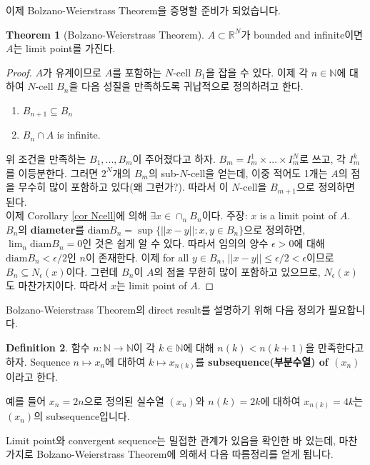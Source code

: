 \documentclass[12pt]{article}
\theoremstyle{definition}
\newtheorem{thm}{Theorem}[section]
\newtheorem{defn}[thm]{Definition}
\def\NN{\mathbb{N}}
\def\RR{\mathbb{R}}
\def\eps{\epsilon}
\newcommand{\norm}[1]{\left\vert\left\vert#1\right\vert\right\vert}
\begin{document}
이제 Bolzano-Weierstrass Theorem을 증명할 준비가 되었습니다.

	\begin{thm}[Bolzano-Weierstrass Theorem]
		\(A \subset \RR^N\)가 bounded and infinite이면 \(A\)는 limit point를 가진다.
	\end{thm}
	\begin{proof}
		\(A\)가 유계이므로 \(A\)를 포함하는 \(N\)-cell \(B_1\)을 잡을 수 있다. 이제 각 \(n \in \NN\)에 대하여 \(N\)-cell \(B_n\)을 다음 성질을 만족하도록 귀납적으로 정의하려고 한다.
		\begin{enumerate}[label=(\alph*), leftmargin=2\parindent]
			\item
			\(B_{n+1} \subseteq B_n\)
			\item
			\(B_n \cap A\) is infinite.
		\end{enumerate}
		위 조건을 만족하는 \(B_1, ..., B_m\)이 주어졌다고 하자. \(B_m = I_m^1 \times ... \times I_m^N\)로 쓰고, 각 \(I_m^k\)를 이등분한다. 그러면 \(2^N\)개의 \(B_m\)의 sub-\(N\)-cell을 얻는데, 이중 적어도 1개는 \(A\)의 점을 무수히 많이 포함하고 있다(왜 그런가?). 따라서 이 \(N\)-cell을 \(B_{m+1}\)으로 정의하면 된다.\\
		이제 Corollary \ref{cor Ncell}에 의해 \(\exists x \in \cap_n B_n\)이다. 주장: \(x\) is a limit point of \(A\).
		\(B_n\)의 \textbf{diameter}를 \(\mathrm{diam}B_n = \sup \{\norm{x-y}: x, y \in B_n\}\)으로 정의하면, \(\lim_n \mathrm{diam}B_n = 0\)인 것은 쉽게 알 수 있다. 따라서 임의의 양수 \(\eps > 0\)에 대해 \(\mathrm{diam}B_n < \eps / 2\)인 \(n\)이 존재한다. 이제 for all \(y \in B_n\), \(\norm{x-y} \le \eps / 2 < \eps\)이므로 \(B_n \subseteq N_\eps (x)\)이다. 그런데 \(B_n\)이 \(A\)의 점을 무한히 많이 포함하고 있으므로, \(N_\eps (x)\)도 마찬가지이다. 따라서 \(x\)는 limit point of \(A\).
	\end{proof}

Bolzano-Weierstrass Theorem의 direct result를 설명하기 위해 다음 정의가 필요합니다.

	\begin{defn}
		함수 \(n: \NN \rightarrow \NN\)이 각 \(k \in \NN\)에 대해 \(n(k) < n(k+1)\)을 만족한다고 하자. Sequence \(n \mapsto x_n\)에 대하여 \(k \mapsto x_{n(k)}\)를 \textbf{subsequence(부분수열) of \((x_n)\)}이라고 한다.
	\end{defn}

예를 들어 \(x_n = 2n\)으로 정의된 실수열 \((x_n)\)와 \(n(k) = 2k\)에 대하여 \(x_{n(k)} = 4k\)는 \((x_n)\)의 subsequence입니다.

Limit point와 convergent sequence는 밀접한 관계가 있음을 확인한 바 있는데, 마찬가지로 Bolzano-Weierstrass Theorem에 의해서 다음 따름정리를 얻게 됩니다.
\end{document}
